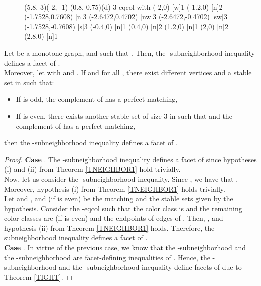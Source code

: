 \begin{figure}[h]
\begin{graph}
\end{graph}~~~~~~~~~~~
\begin{graph}(5.8, 3)(-2, -1)
	\freetext(0.8,-0.75){(d) 3-eqcol with }
	(-2,0)
	{1}
	(-1.2,0)
	{2}
	(-1.7528,0.7608)
	{3}
	(-2.6472,0.4702)
	[nw]{3}
	(-2.6472,-0.4702)
	[sw]{3}
	(-1.7528,-0.7608)
	{3}
	(-0.4,0)
	{1}
	(0.4,0)
	{2}
	(1.2,0)
	{1}
	(2,0)
	{2}
	(2.8,0)
	{1}
\end{graph}
  \caption{}
  \label{minigraph2}
\end{figure}

\begin{tcor} \label{T2RANK2CASEQ1}
Let  be a monotone graph,  and  such that . Then, the -subneighborhood inequality defines a facet of .\\
Moreover, let  with  and .
If  and
for all , there exist different vertices 
and a stable set  in  such that:
\begin{itemize}
\item If  is odd, the complement of  has a perfect matching,
\item If  is even, there exists another stable set  of size 3 in  such that 
and the complement of  has a perfect matching,
\end{itemize}
then the -subneighborhood inequality defines a facet of .
\end{tcor}
\begin{proof}
\textbf{Case }. The -subneighborhood inequality defines
a facet of  since hypotheses (i) and (ii) from Theorem \ref{TNEIGHBOR1} hold trivially.\\
Now, let us consider the -subneighborhood inequality. Since , we have that
. Moreover, hypothesis (i) from Theorem \ref{TNEIGHBOR1}
holds trivially.\\
Let  and ,  and  (if  is even) be the matching and the stable sets given by the hypothesis. Consider the -eqcol such that the
color class  is  and the remaining color classes are  (if  is even) and the endpoints of edges of . Then, ,  and hypothesis (ii) from Theorem \ref{TNEIGHBOR1} holds. Therefore, the -subneighborhood inequality defines a facet of .\\
\textbf{Case }. In virtue of the previous case, we know that the
-subneighborhood and the -subneighborhood are facet-defining inequalities of
. Hence, the -subneighborhood and the -subneighborhood inequality define facets of  due to Theorem \ref{TIGHT}.
\end{proof}


